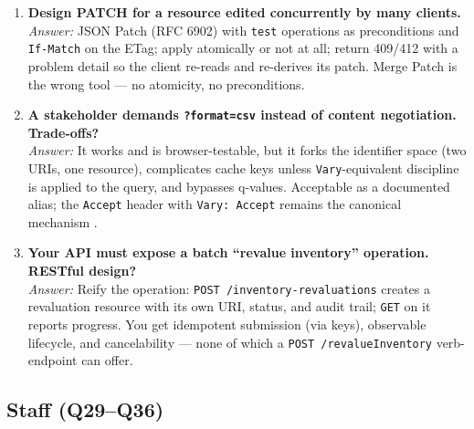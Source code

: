 \begin{enumerate}[label=\textbf{Q\arabic*.}, leftmargin=3.2em, itemsep=0.6em, resume]
        column names in JSON, ORM objects passed to the encoder, schema
        migrations breaking clients \cite{kleppmann2017ddia}.
  \item \textbf{Design PATCH for a resource edited concurrently by many
        clients.}\\
        \emph{Answer:} JSON Patch (RFC 6902) with \texttt{test} operations as
        preconditions and \texttt{If-Match} on the ETag; apply atomically or
        not at all; return 409/412 with a problem detail so the client re-reads
        and re-derives its patch. Merge Patch is the wrong tool --- no
        atomicity, no preconditions.
  \item \textbf{A stakeholder demands \texttt{?format=csv} instead of content
        negotiation. Trade-offs?}\\
        \emph{Answer:} It works and is browser-testable, but it forks the
        identifier space (two URIs, one resource), complicates cache keys
        unless \texttt{Vary}-equivalent discipline is applied to the query, and
        bypasses q-values. Acceptable as a documented alias; the
        \texttt{Accept} header with \texttt{Vary: Accept} remains the canonical
        mechanism \cite{rfc9110}.
  \item \textbf{Your API must expose a batch ``revalue inventory'' operation.
        RESTful design?}\\
        \emph{Answer:} Reify the operation: \texttt{POST /inventory-revaluations}
        creates a revaluation resource with its own URI, status, and audit
        trail; \texttt{GET} on it reports progress. You get idempotent
        submission (via keys), observable lifecycle, and cancelability ---
        none of which a \texttt{POST /revalueInventory} verb-endpoint can
        offer.
\end{enumerate}

\subsection{Staff (Q29--Q36)}

